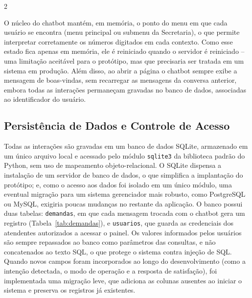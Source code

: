 \documentclass[10pt]{article}
\begin{document}
\begin{multicols}{2}

O núcleo do chatbot mantém, em memória, o ponto do menu em que cada usuário se
encontra (menu principal ou submenu da Secretaria), o que permite interpretar
corretamente os números digitados em cada contexto. Como esse estado fica
apenas em memória, ele é reiniciado quando o servidor é reiniciado -- uma
limitação aceitável para o protótipo, mas que precisaria ser tratada em um sistema em produção. Além disso, ao abrir a página o chatbot sempre exibe a mensagem de boas-vindas, sem recarregar as mensagens da conversa anterior, embora todas as interações permaneçam gravadas no banco de dados, associadas ao identificador do usuário.

\subsection{Persistência de Dados e Controle de Acesso}\label{sec:dados}

Todas as interações são gravadas em um banco de dados SQLite, armazenado em um
único arquivo local e acessado pelo módulo \texttt{sqlite3} da biblioteca
padrão do Python, sem uso de mapeamento objeto-relacional. O SQLite dispensa a
instalação de um servidor de banco de dados, o que simplifica a implantação do
protótipo; e, como o acesso aos dados foi isolado em um único módulo, uma
eventual migração para um sistema gerenciador mais robusto, como PostgreSQL ou
MySQL, exigiria poucas mudanças no restante da aplicação. O banco possui duas
tabelas: \texttt{demandas}, em que cada mensagem trocada com o chatbot gera um
registro (Tabela~\ref{tab:demandas}), e \texttt{usuarios}, que guarda as
credenciais dos atendentes autorizados a acessar o painel. Os valores
informados pelos usuários são sempre repassados ao banco como parâmetros das
consultas, e não concatenados ao texto SQL, o que protege o sistema contra
injeção de SQL. Quando novos campos foram incorporados ao longo do
desenvolvimento (como a intenção detectada, o modo de operação e a resposta de
satisfação), foi implementada uma migração leve, que adiciona as colunas
ausentes ao iniciar o sistema e preserva os registros já existentes.

\end{multicols}
\end{document}
